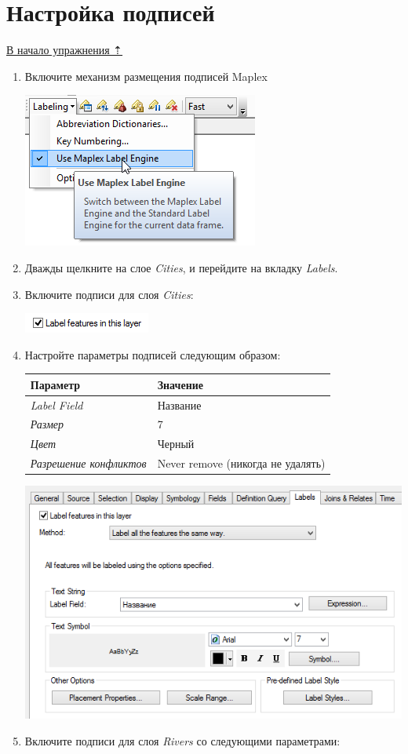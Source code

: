 \documentclass[]{book}
\theoremstyle{definition}
\theoremstyle{definition}
\theoremstyle{definition}
\theoremstyle{remark}
\begin{document}
\hypertarget{map-design-climates-labels}{%
\section{Настройка подписей}\label{map-design-climates-labels}}

\protect\hyperlink{map-design-climates}{В начало упражнения ⇡}

\begin{enumerate}
\def\labelenumi{\arabic{enumi}.}
\item
  Включите механизм размещения подписей Maplex

  \includegraphics{images/Ex01/image26.png}
\item
  Дважды щелкните на слое \emph{Cities}, и перейдите на вкладку
  \emph{Labels}.
\item
  Включите подписи для слоя \emph{Cities}:

  \includegraphics{images/Ex01/image27.png}
\item
  Настройте параметры подписей следующим образом:

  \begin{longtable}[]{@{}ll@{}}
  \toprule
  \textbf{Параметр} & \textbf{Значение}\tabularnewline
  \midrule
  \endhead
  \emph{Label Field} & Название\tabularnewline
  \emph{Размер} & 7\tabularnewline
  \emph{Цвет} & Черный\tabularnewline
  \emph{Разрешение конфликтов} & Never remove (никогда не
  удалять)\tabularnewline
  \bottomrule
  \end{longtable}

  \includegraphics{images/Ex01/image28.png}
\item
  Включите подписи для слоя \emph{Rivers} со следующими параметрами:


\end{enumerate}
\end{document}

